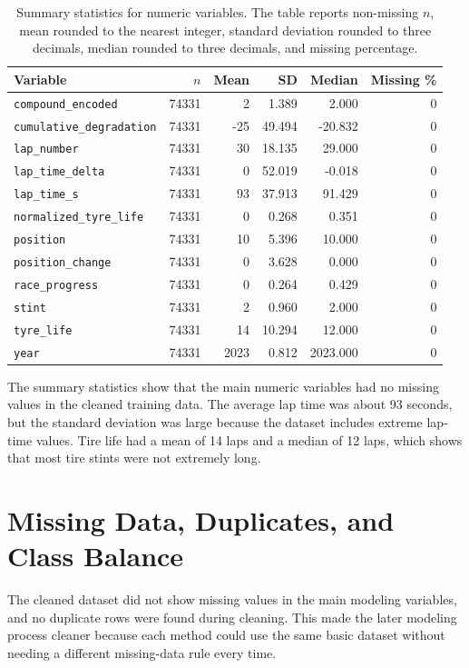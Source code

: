 \documentclass[11pt,oneside,openany]{book}
\begin{document}
\begin{table}[H]
\centering
\small
\caption{Summary statistics for numeric variables. The table reports non-missing \(n\), mean rounded to the nearest integer, standard deviation rounded to three decimals, median rounded to three decimals, and missing percentage.}
\label{tab:summary_statistics}
\begin{tabular}{lrrrrr}
\toprule
Variable & \(n\) & Mean & SD & Median & Missing \%\\
\midrule
\texttt{compound\_encoded} & 74331 & 2 & 1.389 & 2.000 & 0\\
\texttt{cumulative\_degradation} & 74331 & -25 & 49.494 & -20.832 & 0\\
\texttt{lap\_number} & 74331 & 30 & 18.135 & 29.000 & 0\\
\texttt{lap\_time\_delta} & 74331 & 0 & 52.019 & -0.018 & 0\\
\texttt{lap\_time\_s} & 74331 & 93 & 37.913 & 91.429 & 0\\
\texttt{normalized\_tyre\_life} & 74331 & 0 & 0.268 & 0.351 & 0\\
\texttt{position} & 74331 & 10 & 5.396 & 10.000 & 0\\
\texttt{position\_change} & 74331 & 0 & 3.628 & 0.000 & 0\\
\texttt{race\_progress} & 74331 & 0 & 0.264 & 0.429 & 0\\
\texttt{stint} & 74331 & 2 & 0.960 & 2.000 & 0\\
\texttt{tyre\_life} & 74331 & 14 & 10.294 & 12.000 & 0\\
\texttt{year} & 74331 & 2023 & 0.812 & 2023.000 & 0\\
\bottomrule
\end{tabular}
\end{table}

The summary statistics show that the main numeric variables had no missing values in the cleaned training data. The average lap time was about 93 seconds, but the standard deviation was large because the dataset includes extreme lap-time values. Tire life had a mean of 14 laps and a median of 12 laps, which shows that most tire stints were not extremely long.

\section{Missing Data, Duplicates, and Class Balance}

The cleaned dataset did not show missing values in the main modeling variables, and no duplicate rows were found during cleaning. This made the later modeling process cleaner because each method could use the same basic dataset without needing a different missing-data rule every time.
\end{document}
